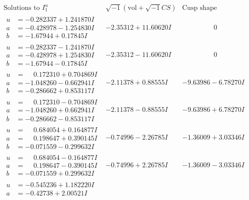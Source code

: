 \documentclass[1p]{elsarticle_modified}
\theoremstyle{definition}
\newcommand{\I}{\sqrt{-1}}
\begin{document}
$$\begin{array}{c|c|c}
\text{Solutions to }I^u_{1}& \I (\text{vol} + \sqrt{-1}CS) & \text{Cusp shape}\\
 \hline 
\begin{aligned}
u &= -0.282337 + 1.241870 I \\
a &= -0.428978 - 1.254830 I \\
b &= -1.67944 + 0.17845 I\end{aligned}
 & -2.35312 + 11.60620 I & \phantom{-0.000000 } 0 \\ \hline\begin{aligned}
u &= -0.282337 - 1.241870 I \\
a &= -0.428978 + 1.254830 I \\
b &= -1.67944 - 0.17845 I\end{aligned}
 & -2.35312 - 11.60620 I & \phantom{-0.000000 } 0 \\ \hline\begin{aligned}
u &= \phantom{-}0.172310 + 0.704869 I \\
a &= -1.048260 - 0.662941 I \\
b &= -0.286662 + 0.853117 I\end{aligned}
 & -2.11378 + 0.88555 I & -9.63986 - 6.78270 I \\ \hline\begin{aligned}
u &= \phantom{-}0.172310 - 0.704869 I \\
a &= -1.048260 + 0.662941 I \\
b &= -0.286662 - 0.853117 I\end{aligned}
 & -2.11378 - 0.88555 I & -9.63986 + 6.78270 I \\ \hline\begin{aligned}
u &= \phantom{-}0.684054 + 0.164877 I \\
a &= \phantom{-}0.198647 + 0.390145 I \\
b &= -0.071559 - 0.299632 I\end{aligned}
 & -0.74996 - 2.26785 I & -1.36009 + 3.03346 I \\ \hline\begin{aligned}
u &= \phantom{-}0.684054 - 0.164877 I \\
a &= \phantom{-}0.198647 - 0.390145 I \\
b &= -0.071559 + 0.299632 I\end{aligned}
 & -0.74996 + 2.26785 I & -1.36009 - 3.03346 I \\ \hline\begin{aligned}
u &= -0.545236 + 1.182220 I \\
a &= -0.42738 + 2.00521 I \\

\end{aligned}
\end{array}$$
\end{document}
